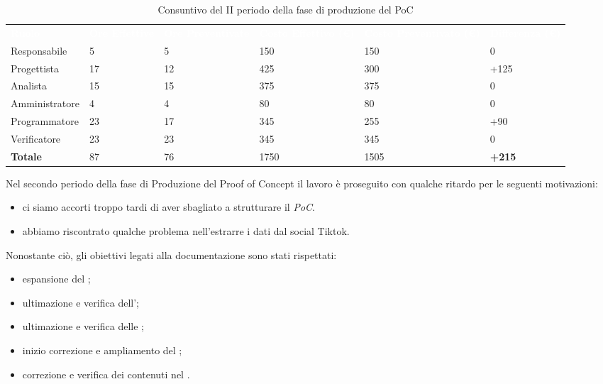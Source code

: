 \begin{table}[H]
\begin{center}
\renewcommand{\arraystretch}{1.5}
\begin{tabular}{ m{}<{\centering}  m{}<{\centering} m{}<{\centering} m{}<{\centering} m{}<{\centering} m{}<{\centering}}	\rowcolor{darkblue}
	\textcolor{white}{\textbf{Ruolo}} & \textcolor{white}{\textbf{Ore Effettive}} & \textcolor{white}{\textbf{Ore Preventivate}}&\textcolor{white}{\textbf{Costo Effettivo (\euro)}}&\textcolor{white}{\textbf{Costo Preventivato (\euro)}}&\textcolor{white}{\textbf{Differenza (\euro)}}\\ 
	
	Responsabile  & 5 & 5 & 150 & 150 & 0 \\	
	
	Progettista & 17 & 12 & 425 & 300 & +125 \\
	
	Analista & 15 & 15 & 375 & 375 & 0 \\

	Amministratore & 4 & 4 & 80 & 80 & 0 \\
	
	Programmatore & 23 & 17 & 345 & 255 & +90 \\
	
	Verificatore & 23 & 23 & 345 & 345 & 0 \\
	
	\textbf{Totale} & 87 & 76 & 1750 & 1505 & \textbf{+215} \\
	
\end{tabular}
\caption{Consuntivo del II periodo della fase di produzione del PoC}
\end{center}
\end{table}

Nel secondo periodo della fase di Produzione del Proof of Concept il lavoro è proseguito con qualche ritardo per le seguenti motivazioni:
\begin{itemize}
\item ci siamo accorti troppo tardi di aver sbagliato a strutturare il \textit{PoC}. 
\item abbiamo riscontrato qualche problema nell'estrarre i dati dal social Tiktok.
\end{itemize}
Nonostante ciò, gli obiettivi legati alla documentazione sono stati rispettati:
\begin{itemize}
\item espansione del \glo{};
\item ultimazione e verifica dell'\AdR{};
\item ultimazione e verifica delle \NdP{};
\item inizio correzione e ampliamento del \PdP{};
\item correzione e verifica dei contenuti nel \PdQ{}.
\end{itemize}

